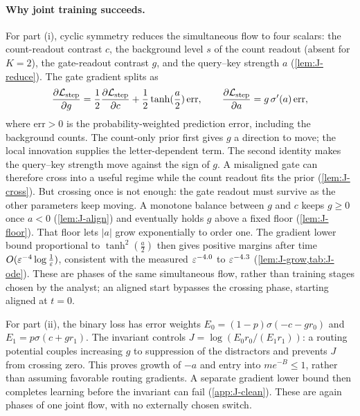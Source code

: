 \paragraph{Why joint training succeeds.} For part (i), cyclic symmetry reduces the simultaneous flow to four scalars: the count-readout contrast $c$,
the background level $s$ of the count readout (absent for $K=2$), the gate-readout contrast $g$, and the query--key strength $a$
(\cref{lem:J-reduce}). The gate gradient splits as
\[
 \pd{\Lstep}{g}=\tfrac{1}{2}\pd{\Lstep}{c}+\tfrac{1}{2}\tanh(\frac{a}{2})\,\mathrm{err},\qquad \pd{\Lstep}{a}=g\,\sigma'(a)\,\mathrm{err},
\]
where $\mathrm{err}>0$ is the probability-weighted prediction error, including the background counts. The count-only prior first
gives $g$ a direction to move; the local innovation supplies the letter-dependent term. The second identity makes the query--key
strength move against the sign of $g$. A misaligned gate can therefore cross into a useful regime while the count readout fits the
prior (\cref{lem:J-cross}). But crossing once is not enough: the gate readout must survive as the other parameters keep moving.
A monotone balance between $g$ and $c$ keeps $g\ge0$ once $a<0$ (\cref{lem:J-align}) and eventually holds $g$ above a fixed floor
(\cref{lem:J-floor}). That floor lets $|a|$ grow exponentially to order one. The gradient lower bound proportional to
$\tanh^2(\frac{a}{2})$ then gives positive margins after time $O(\varepsilon^{-4}\log\frac{1}{\varepsilon})$, consistent with the measured
$\varepsilon^{-4.0}$ to $\varepsilon^{-4.3}$ (\cref{lem:J-grow,tab:J-ode}). These are phases of the same simultaneous flow, rather than
training stages chosen by the analyst; an aligned start bypasses the crossing phase, starting aligned at $t=0$.

For part (ii), the binary loss has error weights $E_0=(1-p)\sigma(-c-gr_0)$ and $E_1=p\sigma(c+gr_1)$.
The invariant controls $J=\log(E_0r_0/(E_1r_1))$: a routing potential couples increasing $g$ to suppression of the distractors
and prevents $J$ from crossing zero. This proves growth of $-a$ and entry into $me^{-B}\le1$, rather than assuming favorable routing gradients.
A separate gradient lower bound then completes learning before the invariant can fail
(\cref{app:J-clean}). These are again phases of one joint flow, with no externally chosen switch.

